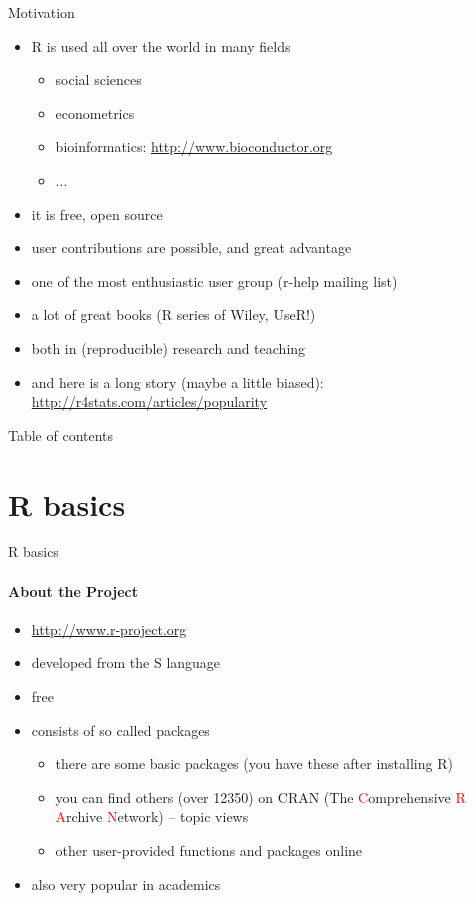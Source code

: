 \documentclass[10pt]{beamer}
\begin{document}
\begin{frame}{Motivation}
\begin{itemize}
\item R is used all over the world in many fields
\begin{itemize}
\item social sciences
\item econometrics
\item bioinformatics: \textcolor{blue}{\url{http://www.bioconductor.org}}
\item $\dots$
\end{itemize}
\item it is free, open source
\item user contributions are possible, and great advantage
\item one of the most enthusiastic user group (r-help mailing list)
\item a lot of great books (R series of Wiley, UseR!)
\item both in (reproducible) research and teaching
\item and here is a long story (maybe a little biased): \textcolor{blue}{\url{http://r4stats.com/articles/popularity}}

\end{itemize}
\end{frame}

\begin{frame}{Table of contents}
\tableofcontents
\end{frame}

\section{R basics}

\begin{frame}{R basics}
\framesubtitle{About the Project}
\begin{itemize}
\item \textcolor{blue}{\url{http://www.r-project.org}}
\item developed from the S language
\item free
\item consists of so called packages
\begin{itemize}
\item there are some basic packages (you have these after installing R)
\item you can find others (over 12350) on CRAN (The \textcolor{red}{C}omprehensive \textcolor{red}{R} \textcolor{red}{A}rchive \textcolor{red}{N}etwork) -- topic views
\item other user-provided functions and packages online
\end{itemize}
\item also very popular in academics
\end{itemize}
\end{frame}
\end{document}
